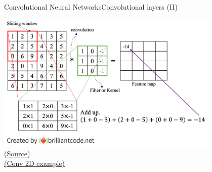 \documentclass[10pt,compress]{beamer} %
\begin{document}
\begin{frame}{Convolutional Neural Networks}{Convolutional layers (II)}
    \centering

	\includegraphics[width=0.8\textwidth]{figs/2dconvolution.png}\\
	\scriptsize\href{https://www.brilliantcode.net/1584/convolutional-neural-networks-1-convolution-layer-stride-padding-kernel/}{(Source)}\\
    \bigskip
	\normalsize \href{https://miro.medium.com/max/500/1*GcI7G-JLAQiEoCON7xFbhg.gif}{(Conv 2D example)}
\end{frame}
\end{document}
